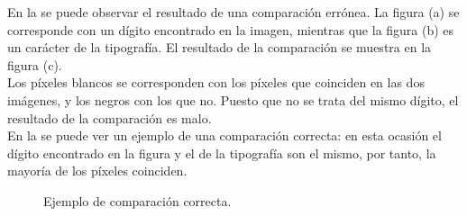 En la  se puede observar el resultado de una comparación errónea. La figura (a) se corresponde con un dígito encontrado en la imagen, mientras que la figura (b) es un carácter de la tipografía. El resultado de la comparación se muestra en la figura (c). \\

Los píxeles blancos se corresponden con los píxeles que coinciden en las dos imágenes, y los negros con los que no. Puesto que no se trata del mismo dígito, el resultado de la comparación es malo.\\

En la  se puede ver un ejemplo de una comparación correcta: en esta ocasión el dígito encontrado en la figura y el de la tipografía son el mismo, por tanto, la mayoría de los píxeles coinciden.

\begin{figure}[!h]
\centering {}
\caption{\small{Ejemplo de comparación correcta.}} \label{ComCorrecta}
\end{figure}


